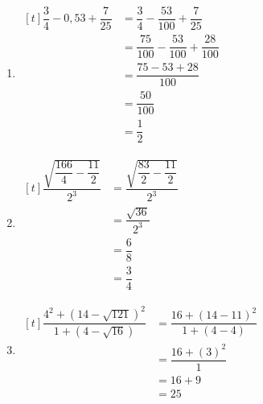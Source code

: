 \medskip

\begin{enumerate}
\setlength\itemsep{1em}
\item $\begin{aligned}[t]
    \dfrac{3}{4}-0,53+\dfrac{7}{25}&=\dfrac{3}{4}-\dfrac{53}{100}+\dfrac{7}{25}\\
    &=\dfrac{75}{100}-\dfrac{53}{100}+\dfrac{28}{100}\\
    &=\dfrac{75-53+28}{100}\\
    &=\dfrac{50}{100}\\
    &=\dfrac{1}{2}
\end{aligned}$
\item $\begin{aligned}[t]
    \dfrac{\sqrt{\dfrac{166}{4}-\dfrac{11}{2}}}{2^3}&=\dfrac{\sqrt{\dfrac{83}{2}-\dfrac{11}{2}}}{2^3}\\
    &=\dfrac{\sqrt{36}}{2^3}\\
    &=\dfrac{6}{8}\\
    &=\dfrac{3}{4}
\end{aligned}$
\item $\begin{aligned}[t]
\dfrac{4^2+(14-\sqrt{121})^2}{1+(4-\sqrt{16})}&=\dfrac{16+(14-11)^2}{1+(4-4)}\\
&=\dfrac{16+(3)^2}{1}\\
&=16+9\\
&=25
\end{aligned}$
\end{enumerate}
